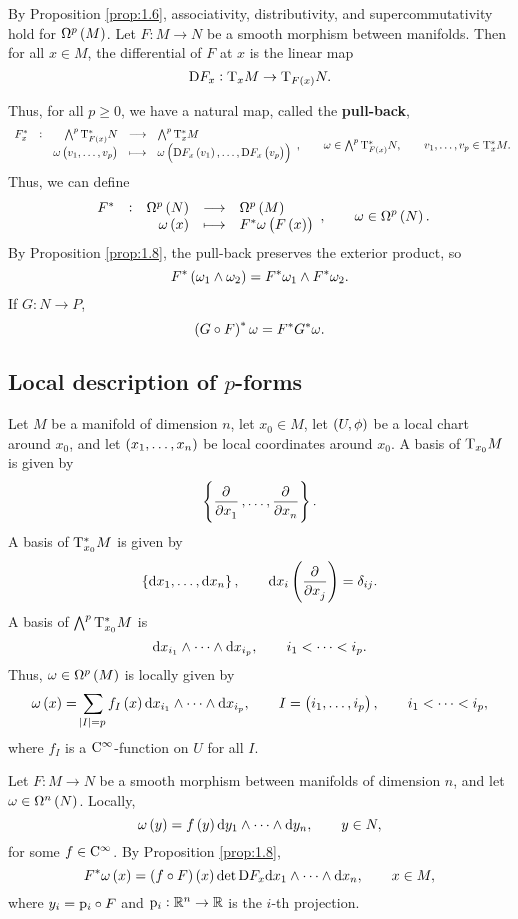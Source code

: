 By Proposition \ref{prop:1.6}, associativity, distributivity, and supercommutativity hold for $ \Omega^p\br{M} $. Let $ F : M \to N $ be a smooth morphism between manifolds. Then for all $ x \in M $, the differential of $ F $ at $ x $ is the linear map
$$ \D F_x : \T_xM \to \T_{F\br{x}}N. $$

\pagebreak

Thus, for all $ p \ge 0 $, we have a natural map, called the \textbf{pull-back},
$$ \function[F_x^*]{\ext^p\T_{F\br{x}}^*N}{\ext^p\T_x^*M}{\omega\br{v_1, \dots, v_p}}{\omega\br{\D F_x\br{v_1}, \dots, \D F_x\br{v_p}}}, \qquad \omega \in \ext^p\T_{F\br{x}}^*N, \qquad v_1, \dots, v_p \in \T_x^*M. $$
Thus, we can define
$$ \function[F^*]{\Omega^p\br{N}}{\Omega^p\br{M}}{\omega\br{x}}{F^*\omega\br{F\br{x}}}, \qquad \omega \in \Omega^p\br{N}. $$
By Proposition \ref{prop:1.8}, the pull-back preserves the exterior product, so
$$ F^*\br{\omega_1 \wedge \omega_2} = F^*\omega_1 \wedge F^*\omega_2. $$
If $ G : N \to P $,
$$ \br{G \circ F}^*\omega = F^*G^*\omega. $$

\subsection{Local description of \texorpdfstring{$ p $}{p}-forms}

Let $ M $ be a manifold of dimension $ n $, let $ x_0 \in M $, let $ \br{U, \phi} $ be a local chart around $ x_0 $, and let $ \br{x_1, \dots, x_n} $ be local coordinates around $ x_0 $. A basis of $ \mathrm{T}_{x_0}M $ is given by
$$ \cbr{\dpd{}{x_1}, \dots, \dpd{}{x_n}}. $$
A basis of $ \mathrm{T}_{x_0}^*M $ is given by
$$ \cbr{\d x_1, \dots, \d x_n}, \qquad \d x_i\br{\dpd{}{x_j}} = \delta_{ij}. $$
A basis of $ \textstyle\bigwedge^p\mathrm{T}_{x_0}^*M $ is
$$ \mathrm{d} x_{i_1} \wedge \dots \wedge \mathrm{d} x_{i_p}, \qquad i_1 < \dots < i_p. $$
Thus, $ \omega \in \Omega^p\br{M} $ is locally given by
$$ \omega\br{x} = \sum_{\abs{I} = p} f_I\br{x}\d x_{i_1} \wedge \dots \wedge \d x_{i_p}, \qquad I = \br{i_1, \dots, i_p}, \qquad i_1 < \dots < i_p, $$
where $ f_I $ is a $ \mathrm{C}^\infty $-function on $ U $ for all $ I $.

\begin{example}
Let $ F : M \to N $ be a smooth morphism between manifolds of dimension $ n $, and let $ \omega \in \Omega^n\br{N} $. Locally,
$$ \omega\br{y} = f\br{y}\d y_1 \wedge \dots \wedge \d y_n, \qquad y \in N, $$
for some $ f \in \mathrm{C}^\infty $. By Proposition \ref{prop:1.8},
$$ F^*\omega\br{x} = \br{f \circ F}\br{x}\det \D F_x\d x_1 \wedge \dots \wedge \d x_n, \qquad x \in M, $$
where $ y_i = \mathrm{p}_i \circ F $ and $ \mathrm{p}_i : \mathbb{R}^n \to \mathbb{R} $ is the $ i $-th projection.
\end{example}

